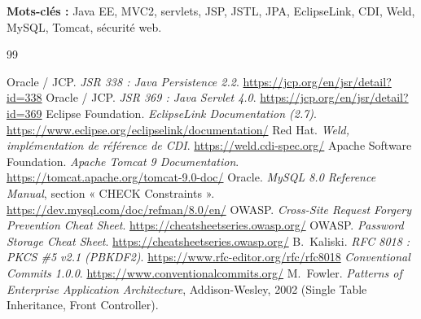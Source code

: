 \documentclass[11pt,a4paper]{report}
\begin{document}
\textbf{Mots-clés :} Java EE, MVC2, servlets, JSP, JSTL, JPA, EclipseLink, CDI, Weld, MySQL, Tomcat, sécurité web.

\tableofcontents
\listoffigures
\listoftables














\begin{thebibliography}{99}
 Oracle / JCP. \textit{JSR 338 : Java Persistence 2.2}. \url{https://jcp.org/en/jsr/detail?id=338}
 Oracle / JCP. \textit{JSR 369 : Java Servlet 4.0}. \url{https://jcp.org/en/jsr/detail?id=369}
 Eclipse Foundation. \textit{EclipseLink Documentation (2.7)}. \url{https://www.eclipse.org/eclipselink/documentation/}
 Red Hat. \textit{Weld, implémentation de référence de CDI}. \url{https://weld.cdi-spec.org/}
 Apache Software Foundation. \textit{Apache Tomcat 9 Documentation}. \url{https://tomcat.apache.org/tomcat-9.0-doc/}
 Oracle. \textit{MySQL 8.0 Reference Manual}, section « CHECK Constraints ». \url{https://dev.mysql.com/doc/refman/8.0/en/}
 OWASP. \textit{Cross-Site Request Forgery Prevention Cheat Sheet}. \url{https://cheatsheetseries.owasp.org/}
 OWASP. \textit{Password Storage Cheat Sheet}. \url{https://cheatsheetseries.owasp.org/}
 B.~Kaliski. \textit{RFC 8018 : PKCS \#5 v2.1 (PBKDF2)}. \url{https://www.rfc-editor.org/rfc/rfc8018}
 \textit{Conventional Commits 1.0.0}. \url{https://www.conventionalcommits.org/}
 M.~Fowler. \textit{Patterns of Enterprise Application Architecture}, Addison-Wesley, 2002 (Single Table Inheritance, Front Controller).
\end{thebibliography}

\appendix

\end{document}
